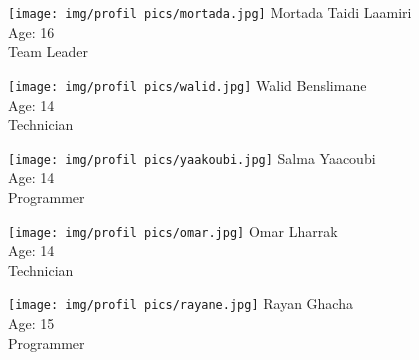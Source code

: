 \begin{minipage}[t]{0.15\textwidth}
    \centering
    \texttt{[image: img/profil pics/mortada.jpg]} 
    {\scriptsize Mortada Taidi Laamiri} \\ 
    {\scriptsize Age: 16} \\ 
    {\scriptsize Team Leader}
\end{minipage}
\hfill
\begin{minipage}[t]{0.15\textwidth}
    \centering
    \texttt{[image: img/profil pics/walid.jpg]} 
    {\scriptsize Walid Benslimane} \\ 
    {\scriptsize Age: 14} \\ 
    {\scriptsize Technician}
\end{minipage}
\hfill
\begin{minipage}[t]{0.15\textwidth}
    \centering
    \texttt{[image: img/profil pics/yaakoubi.jpg]}
    {\scriptsize Salma Yaacoubi} \\ 
    {\scriptsize Age: 14} \\ 
    {\scriptsize Programmer}
\end{minipage}
\hfill
\begin{minipage}[t]{0.15\textwidth}
    \centering
    \texttt{[image: img/profil pics/omar.jpg]} 
    {\scriptsize Omar   Lharrak}\\ 
    {\scriptsize Age: 14} \\ 
    {\scriptsize Technician}
\end{minipage}
\hfill
\begin{minipage}[t]{0.15\textwidth}
    \centering
    \texttt{[image: img/profil pics/rayane.jpg]} 
    {\scriptsize Rayan   Ghacha} \\ 
    {\scriptsize Age: 15} \\ 
    {\scriptsize Programmer}
\end{minipage}

\vspace{0.8cm}

